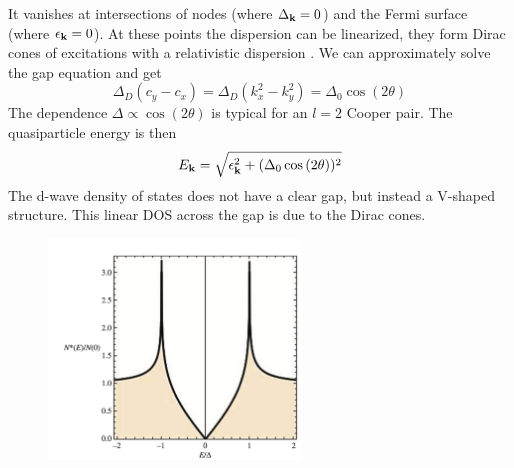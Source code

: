 \documentclass[../main.tex]{subfiles}
\begin{document}
It vanishes at intersections of nodes (where \(\Delta_{\bm{\mathrm{k}}} = 0\)) and the Fermi surface (where \(\epsilon_{\bm{\mathrm{k}}} = 0\)).
At these points the dispersion can be linearized, they form Dirac cones of excitations with a relativistic dispersion .
We can approximately solve the gap equation and get
\begin{equation}
    \Delta_D (c_y - c_x) = \Delta_D (k_x^2 - k_y^2) = \Delta_0 \cos{(2\theta)}
\end{equation}
The dependence \(\Delta \propto \cos{(2\theta)}\) is typical for an \(l=2\) Cooper pair. 
The quasiparticle energy is then
\begin{equation}
    E_{\bm{\mathrm{k}}} = \sqrt{\epsilon_{\bm{\mathrm{k}}}^2 + (\Delta_0 \cos{(2\theta)})^2}
\end{equation}
The d-wave density of states does not have a clear gap, but instead a V-shaped structure.
This linear DOS across the gap is due to the Dirac cones.
\begin{figure}[ht]
    \centering
    \includegraphics[width=0.6\textwidth]{notes/images/density of states d-wave}
    \caption{}
    \label{fig:d-wave density of states}
\end{figure}
\end{document}
